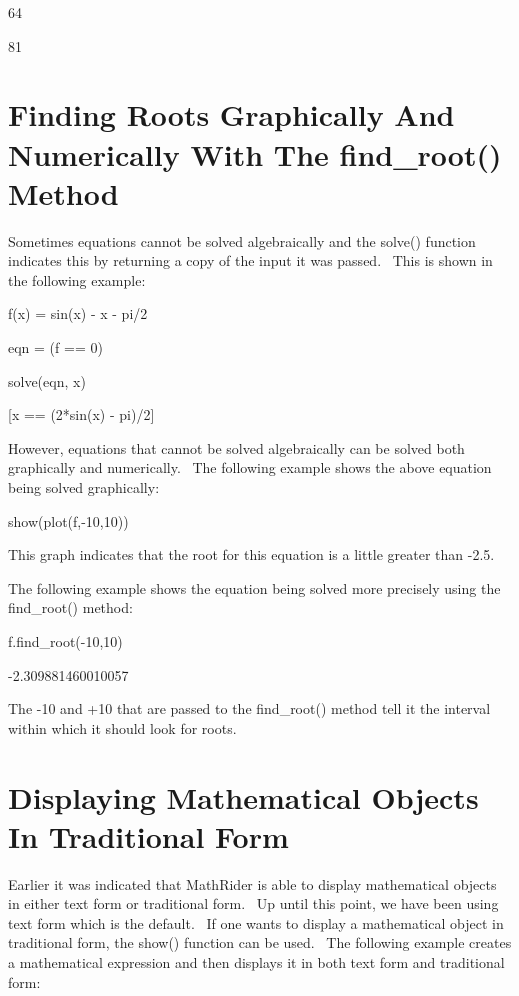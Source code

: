 \documentclass[12pt,twoside]{book}
\begin{document}
64

81

\section[Finding Roots Graphically And Numerically With The find\_root() Method]{Finding Roots Graphically And Numerically With The find\_root() Method}

Sometimes equations cannot be solved algebraically and the solve() function indicates this by returning a copy of the input it was passed. \ This is shown in the following example: 

\bigskip

f(x) = sin(x) {}- x {}- pi/2

eqn = (f == 0)

solve(eqn, x)

{\textbar}

[x == (2*sin(x) {}- pi)/2]


\bigskip

However, equations that cannot be solved algebraically can be solved both graphically and numerically. \ The following example shows the above equation being solved graphically: 

\bigskip

show(plot(f,{}-10,10))

{\textbar}


\bigskip

This graph indicates that the root for this equation is a little greater than {}-2.5. 

\bigskip

The following example shows the equation being solved more precisely using the find\_root() method: 

\bigskip

f.find\_root({}-10,10)

{\textbar}

{}-2.309881460010057


\bigskip

The {}-10 and +10 that are passed to the find\_root() method tell it the interval within which it should look for roots.

\section[Displaying Mathematical Objects In Traditional Form]{Displaying Mathematical Objects In Traditional Form}

Earlier it was indicated that MathRider is able to display mathematical objects in either text form or traditional form. \ Up until this point, we have been using text form which is the default. \ If one wants to display a mathematical object in traditional form, the show() function can be used. \ The following example creates a mathematical expression and then displays it in both text form and traditional form: 
\end{document}
